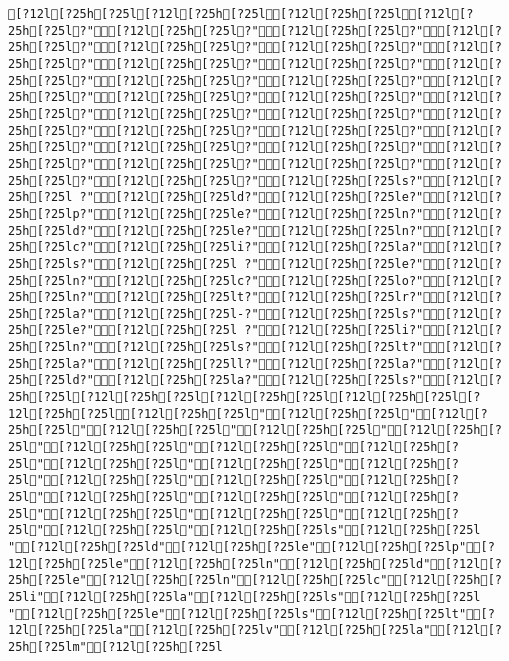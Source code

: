 \documentclass{scrartcl}
\begin{document}
\begin{Verbatim}
[?12l[?25h[?25l[?12l[?25h[?25l[?12l[?25h[?25l[?12l[?25h[?25l?"[?12l[?25h[?25l?"[?12l[?25h[?25l?"[?12l[?25h[?25l?"[?12l[?25h[?25l?"[?12l[?25h[?25l?"[?12l[?25h[?25l?"[?12l[?25h[?25l?"[?12l[?25h[?25l?"[?12l[?25h[?25l?"[?12l[?25h[?25l?"[?12l[?25h[?25l?"[?12l[?25h[?25l?"[?12l[?25h[?25l?"[?12l[?25h[?25l?"[?12l[?25h[?25l?"[?12l[?25h[?25l?"[?12l[?25h[?25l?"[?12l[?25h[?25l?"[?12l[?25h[?25l?"[?12l[?25h[?25l?"[?12l[?25h[?25l?"[?12l[?25h[?25l?"[?12l[?25h[?25l?"[?12l[?25h[?25l?"[?12l[?25h[?25l?"[?12l[?25h[?25l?"[?12l[?25h[?25l?"[?12l[?25h[?25l?"[?12l[?25h[?25ls?"[?12l[?25h[?25l ?"[?12l[?25h[?25ld?"[?12l[?25h[?25le?"[?12l[?25h[?25lp?"[?12l[?25h[?25le?"[?12l[?25h[?25ln?"[?12l[?25h[?25ld?"[?12l[?25h[?25le?"[?12l[?25h[?25ln?"[?12l[?25h[?25lc?"[?12l[?25h[?25li?"[?12l[?25h[?25la?"[?12l[?25h[?25ls?"[?12l[?25h[?25l ?"[?12l[?25h[?25le?"[?12l[?25h[?25ln?"[?12l[?25h[?25lc?"[?12l[?25h[?25lo?"[?12l[?25h[?25ln?"[?12l[?25h[?25lt?"[?12l[?25h[?25lr?"[?12l[?25h[?25la?"[?12l[?25h[?25l-?"[?12l[?25h[?25ls?"[?12l[?25h[?25le?"[?12l[?25h[?25l ?"[?12l[?25h[?25li?"[?12l[?25h[?25ln?"[?12l[?25h[?25ls?"[?12l[?25h[?25lt?"[?12l[?25h[?25la?"[?12l[?25h[?25ll?"[?12l[?25h[?25la?"[?12l[?25h[?25ld?"[?12l[?25h[?25la?"[?12l[?25h[?25ls?"[?12l[?25h[?25l[?12l[?25h[?25l[?12l[?25h[?25l[?12l[?25h[?25l[?12l[?25h[?25l[?12l[?25h[?25l"[?12l[?25h[?25l"[?12l[?25h[?25l"[?12l[?25h[?25l"[?12l[?25h[?25l"[?12l[?25h[?25l"[?12l[?25h[?25l"[?12l[?25h[?25l"[?12l[?25h[?25l"[?12l[?25h[?25l"[?12l[?25h[?25l"[?12l[?25h[?25l"[?12l[?25h[?25l"[?12l[?25h[?25l"[?12l[?25h[?25l"[?12l[?25h[?25l"[?12l[?25h[?25l"[?12l[?25h[?25l"[?12l[?25h[?25l"[?12l[?25h[?25l"[?12l[?25h[?25l"[?12l[?25h[?25l"[?12l[?25h[?25ls"[?12l[?25h[?25l "[?12l[?25h[?25ld"[?12l[?25h[?25le"[?12l[?25h[?25lp"[?12l[?25h[?25le"[?12l[?25h[?25ln"[?12l[?25h[?25ld"[?12l[?25h[?25le"[?12l[?25h[?25ln"[?12l[?25h[?25lc"[?12l[?25h[?25li"[?12l[?25h[?25la"[?12l[?25h[?25ls"[?12l[?25h[?25l "[?12l[?25h[?25le"[?12l[?25h[?25ls"[?12l[?25h[?25lt"[?12l[?25h[?25la"[?12l[?25h[?25lv"[?12l[?25h[?25la"[?12l[?25h[?25lm"[?12l[?25h[?25l 
\end{Verbatim}
\end{document}
